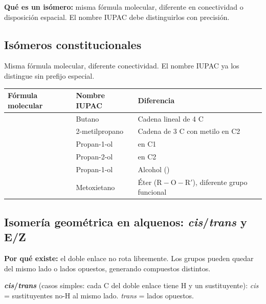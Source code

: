 \textbf{Qué es un isómero:} misma fórmula molecular, diferente en conectividad o
disposición espacial. El nombre IUPAC debe distinguirlos con precisión.

{}
\subsection*{\textcolor{blueunam}{Isómeros constitucionales}}

Misma fórmula molecular, diferente conectividad. El nombre IUPAC ya los distingue sin
prefijo especial.

\begin{longtable}{L{3.5cm} L{3.5cm} L{6.5cm}}
\toprule
\textbf{Fórmula molecular} & \textbf{Nombre IUPAC} & \textbf{Diferencia} \\
\midrule\endhead\bottomrule\endlastfoot
{}
  & Butano         & Cadena lineal de 4 C \\
  & 2-metilpropano & Cadena de 3 C con metilo en C2 \\
\midrule{}
  & Propan-1-ol &  en C1 \\
  & Propan-2-ol &  en C2 \\
\midrule{}
  & Propan-1-ol & Alcohol () \\
  & Metoxietano & Éter ($\mathrm{R{-}O{-}R'}$), diferente grupo funcional \\
\end{longtable}

{}
\subsection*{\textcolor{blueunam}{Isomería geométrica en alquenos: \textit{cis}/\textit{trans} y E/Z}}

\textbf{Por qué existe:} el doble enlace  no rota libremente. Los grupos pueden
quedar del mismo lado o lados opuestos, generando compuestos distintos.

\textbf{\textit{cis}/\textit{trans}} (casos simples: cada C del doble enlace tiene H y un sustituyente):
\textit{cis} = sustituyentes no-H al mismo lado. \textit{trans} = lados opuestos.

